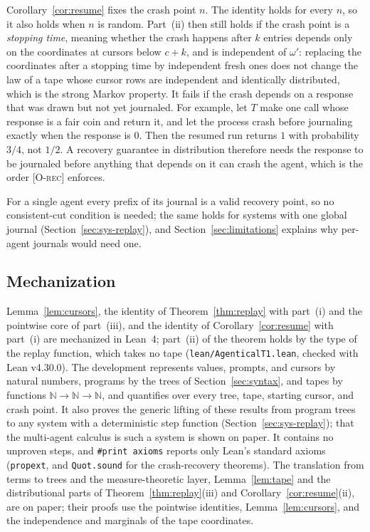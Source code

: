 \begin{remark}
Corollary~\ref{cor:resume} fixes the crash point $n$.
The identity holds for every $n$, so it also holds when $n$ is random.
Part~(ii) then still holds if the crash point is a \emph{stopping time}, meaning whether the
crash happens after $k$ entries depends only on the coordinates at cursors below $c+k$, and is
independent of $\omega'$: replacing the coordinates after a stopping time by independent fresh
ones does not change the law of a tape whose cursor rows are independent and identically
distributed, which is the strong Markov property.
It fails if the crash depends on a response that was drawn but not yet journaled.
For example, let $T$ make one call whose response is a fair coin and return it, and let the
process crash before journaling exactly when the response is $0$.
Then the resumed run returns $1$ with probability $3/4$, not $1/2$.
A recovery guarantee in distribution therefore needs the response to be journaled before
anything that depends on it can crash the agent, which is the order \textsc{[O-rec]} enforces.
\end{remark}

\noindent
For a single agent every prefix of its journal is a valid recovery point, so no
consistent-cut condition is needed; the same holds for systems with one global journal
(Section~\ref{sec:sys-replay}), and Section~\ref{sec:limitations} explains why per-agent
journals would need one.

\subsection{Mechanization}
\label{sec:mechanization}

Lemma~\ref{lem:cursors}, the identity of Theorem~\ref{thm:replay} with part~(i) and the
pointwise core of part~(iii), and the identity of Corollary~\ref{cor:resume} with part~(i) are
mechanized in Lean~4; part~(ii) of the theorem holds by the type of the replay function, which
takes no tape (\texttt{lean/AgenticalT1.lean}, checked with Lean v4.30.0).
The development represents values, prompts, and cursors by natural numbers, programs by the
trees of Section~\ref{sec:syntax}, and tapes by functions
$\mathbb{N} \to \mathbb{N} \to \mathbb{N}$, and quantifies over every tree, tape, starting
cursor, and crash point.
It also proves the generic lifting of these results from program trees to any system with a
deterministic step function (Section~\ref{sec:sys-replay}); that the multi-agent calculus is
such a system is shown on paper.
It contains no unproven steps, and \texttt{\#print axioms} reports only Lean's standard axioms
(\texttt{propext}, and \texttt{Quot.sound} for the crash-recovery theorems).
The translation from terms to trees and the measure-theoretic layer, Lemma~\ref{lem:tape} and
the distributional parts of Theorem~\ref{thm:replay}(iii) and Corollary~\ref{cor:resume}(ii),
are on paper; their proofs use the pointwise identities, Lemma~\ref{lem:cursors}, and the
independence and marginals of the tape coordinates.
